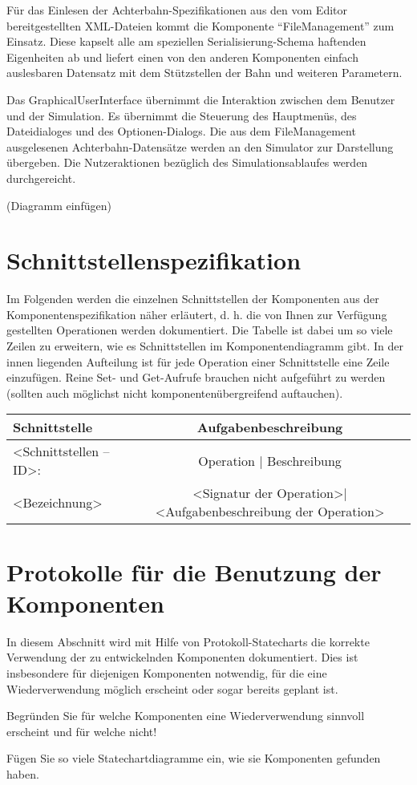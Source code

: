 Für das Einlesen der Achterbahn-Spezifikationen aus den vom Editor bereitgestellten
XML-Dateien kommt die Komponente ``FileManagement'' zum Einsatz. Diese kapselt alle
am speziellen Serialisierung-Schema haftenden Eigenheiten ab und liefert einen
von den anderen Komponenten einfach auslesbaren Datensatz mit dem Stützstellen der
Bahn und weiteren Parametern.

Das GraphicalUserInterface übernimmt die Interaktion zwischen dem Benutzer und
der Simulation. Es übernimmt die Steuerung des Hauptmenüs, des Dateidialoges und
des Optionen-Dialogs. Die aus dem FileManagement ausgelesenen Achterbahn-Datensätze
werden an den Simulator zur Darstellung übergeben. Die Nutzeraktionen bezüglich des
Simulationsablaufes werden durchgereicht.

(Diagramm einfügen)

\section{Schnittstellenspezifikation}

Im Folgenden werden die einzelnen Schnittstellen der Komponenten aus der
Komponentenspezifikation näher erläutert, d. h. die von Ihnen zur Verfügung
gestellten Operationen werden dokumentiert. Die Tabelle ist dabei um so viele
Zeilen zu erweitern, wie es Schnittstellen im Komponentendiagramm gibt. In der
innen liegenden Aufteilung ist für jede Operation einer Schnittstelle eine
Zeile einzufügen.  Reine Set- und Get-Aufrufe brauchen nicht aufgeführt zu
werden (sollten auch möglichst nicht komponentenübergreifend auftauchen).

\begin{tabular}[ht]{|l|c|}
 \hline
 Schnittstelle & Aufgabenbeschreibung\\
 \hline\hline
    <Schnittstellen – ID>: & Operation      |     Beschreibung\\
 \hline\hline\hline
    <Bezeichnung>  & <Signatur der Operation>|<Aufgabenbeschreibung der
                                                                    Operation>\\
    \hline
  \end{tabular}





\section{Protokolle für die Benutzung der Komponenten}

In diesem Abschnitt wird mit Hilfe von Protokoll-Statecharts die korrekte
Verwendung der zu entwickelnden Komponenten dokumentiert. Dies ist insbesondere
für diejenigen Komponenten notwendig, für die eine Wiederverwendung möglich
erscheint oder sogar bereits geplant ist.

Begründen Sie für welche Komponenten eine Wiederverwendung sinnvoll erscheint
und für welche nicht!

Fügen Sie so viele Statechartdiagramme ein, wie sie Komponenten gefunden haben.
